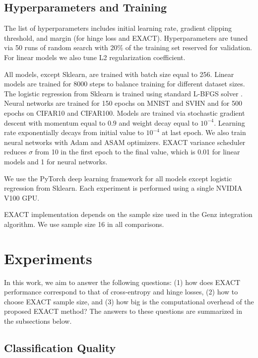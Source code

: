 \documentclass[nohyperref]{article}
\theoremstyle{plain}
\theoremstyle{definition}
\theoremstyle{remark}
\begin{document}
\subsection{Hyperparameters and Training}

The list of hyperparameters includes initial learning rate, gradient clipping threshold, and margin (for hinge loss and EXACT). Hyperparameters are tuned via 50 runs of random search with 20\% of the training set reserved for validation. For linear models we also tune L2 regularization coefficient.


All models, except Sklearn, are trained with batch size equal to 256. Linear models are trained for 8000 steps to balance training for different dataset sizes. The logistic regression from Sklearn is trained using standard L-BFGS solver \cite{byrd1995limited}. Neural networks are trained for 150 epochs on MNIST and SVHN and for 500 epochs on CIFAR10 and CIFAR100. Models are trained via stochastic gradient descent with momentum equal to $0.9$ and weight decay equal to $10^{-4}$. Learning rate exponentially decays from initial value to $10^{-4}$ at last epoch.  We also train neural networks with Adam \cite{kingma2015adam} and ASAM \cite{kwon2021asam} optimizers. EXACT variance scheduler reduces $\sigma$ from 10 in the first epoch to the final value, which is 0.01 for linear models and 1 for neural networks.

We use the PyTorch deep learning framework \cite{paszke2019pytorch} for all models except logistic regression from Sklearn. Each experiment is performed using a single NVIDIA V100 GPU.

EXACT implementation depends on the sample size used in the Genz integration algorithm. We use sample size 16 in all comparisons.

\section{Experiments}
In this work, we aim to answer the following questions: (1) how does EXACT performance correspond to that of cross-entropy and hinge losses, (2) how to choose EXACT sample size, and (3) how big is the computational overhead of the proposed EXACT method? The answers to these questions are summarized in the subsections below.

\subsection{Classification Quality}
\end{document}
